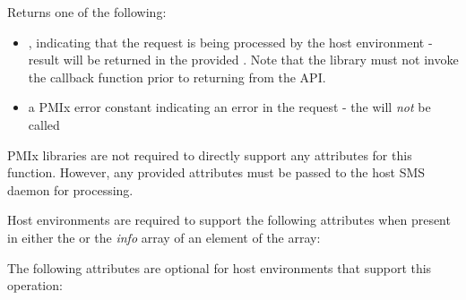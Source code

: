 \begin{arglist}
\end{arglist}

Returns one of the following:

\begin{itemize}
    \item {}, indicating that the request is being processed by the host environment - result will be returned in the provided . Note that the library must not invoke the callback function prior to returning from the \ac{API}.
    \item a PMIx error constant indicating an error in the request - the  will \textit{not} be called
\end{itemize}


\reqattrstart
\ac{PMIx} libraries are not required to directly support any attributes for this function. However, any provided attributes must be passed to the host \ac{SMS} daemon for processing.

Host environments are required to support the following attributes when present in either the  or the \textit{info} array of an element of the  array:


\reqattrend

\optattrstart
The following attributes are optional for host environments that support this operation:

